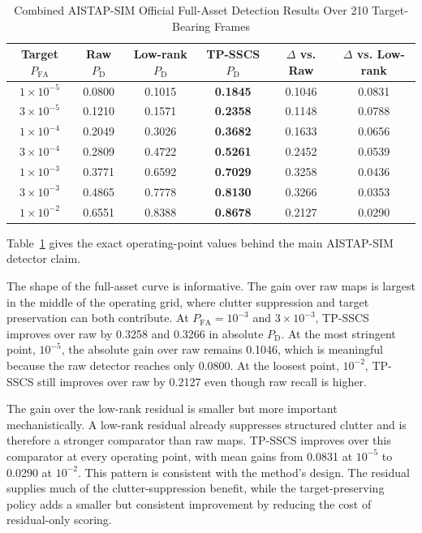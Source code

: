\documentclass[journal]{IEEEtran}
\begin{document}
\begin{table}[!t]
\caption{Combined AISTAP-SIM Official Full-Asset Detection Results Over 210 Target-Bearing Frames}
\label{tab:aistap-full-asset-results}
\centering
\footnotesize
\renewcommand{\arraystretch}{1.12}
\begin{tabular}{@{}cccccc@{}}
\toprule
Target $P_{\mathrm{FA}}$ & Raw $P_{\mathrm{D}}$ & Low-rank $P_{\mathrm{D}}$ & TP-SSCS $P_{\mathrm{D}}$ & $\Delta$ vs. Raw & $\Delta$ vs. Low-rank \\
\midrule
$1{\times}10^{-5}$ & 0.0800 & 0.1015 & \textbf{0.1845} & 0.1046 & 0.0831 \\
$3{\times}10^{-5}$ & 0.1210 & 0.1571 & \textbf{0.2358} & 0.1148 & 0.0788 \\
$1{\times}10^{-4}$ & 0.2049 & 0.3026 & \textbf{0.3682} & 0.1633 & 0.0656 \\
$3{\times}10^{-4}$ & 0.2809 & 0.4722 & \textbf{0.5261} & 0.2452 & 0.0539 \\
$1{\times}10^{-3}$ & 0.3771 & 0.6592 & \textbf{0.7029} & 0.3258 & 0.0436 \\
$3{\times}10^{-3}$ & 0.4865 & 0.7778 & \textbf{0.8130} & 0.3266 & 0.0353 \\
$1{\times}10^{-2}$ & 0.6551 & 0.8388 & \textbf{0.8678} & 0.2127 & 0.0290 \\
\bottomrule
\end{tabular}
\vspace{0.35em}
\parbox{0.94\textwidth}{\scriptsize Table~\ref{tab:aistap-full-asset-results} gives the exact operating-point values behind the main AISTAP-SIM detector claim.}
\end{table}

The shape of the full-asset curve is informative. The gain over raw maps is largest in the middle of the operating grid, where clutter suppression and target preservation can both contribute. At $P_{\mathrm{FA}}=10^{-3}$ and $3\times10^{-3}$, TP-SSCS improves over raw by 0.3258 and 0.3266 in absolute $P_{\mathrm{D}}$. At the most stringent point, $10^{-5}$, the absolute gain over raw remains 0.1046, which is meaningful because the raw detector reaches only 0.0800. At the loosest point, $10^{-2}$, TP-SSCS still improves over raw by 0.2127 even though raw recall is higher.

The gain over the low-rank residual is smaller but more important mechanistically. A low-rank residual already suppresses structured clutter and is therefore a stronger comparator than raw maps. TP-SSCS improves over this comparator at every operating point, with mean gains from 0.0831 at $10^{-5}$ to 0.0290 at $10^{-2}$. This pattern is consistent with the method's design. The residual supplies much of the clutter-suppression benefit, while the target-preserving policy adds a smaller but consistent improvement by reducing the cost of residual-only scoring.
\end{document}
